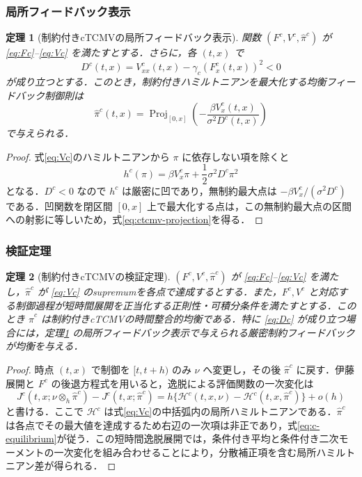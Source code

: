 \documentclass[10pt,a4paper]{article}
\theoremstyle{plain}
\newtheorem{theorem}{定理}
\theoremstyle{definition}
\DeclareMathOperator{\Proj}{Proj}
\newcommand{\Hamil}{\mathcal{H}}
\begin{document}
\subsubsection{局所フィードバック表示}

\begin{theorem}[制約付きcTCMVの局所フィードバック表示]
\label{thm:ctcmv-projection}
関数 $(F^c,V^c,\hat\pi^c)$ が \eqref{eq:Fc}--\eqref{eq:Vc} を満たすとする．さらに，各 $(t,x)$ で
\begin{equation}
  D^c(t,x)=V_{xx}^c(t,x)-\gamma_c(F_x^c(t,x))^2<0
  \label{eq:Dc}
\end{equation}
が成り立つとする．このとき，制約付きハミルトニアンを最大化する均衡フィードバック制御則は
\begin{equation}
  \boxed{
  \hat\pi^c(t,x)=
  \Proj_{[0,x]}
  \left(
  -\frac{\beta V_x^c(t,x)}{\sigma^2D^c(t,x)}
  \right)
  }
  \label{eq:ctcmv-projection}
\end{equation}
で与えられる．
\end{theorem}

\begin{proof}
式\eqref{eq:Vc}のハミルトニアンから $\pi$ に依存しない項を除くと
\[
 h^c(\pi)=\beta V_x^c\pi+\frac12\sigma^2D^c\pi^2
\]
となる．$D^c<0$ なので $h^c$ は厳密に凹であり，無制約最大点は $-\beta V_x^c/(\sigma^2D^c)$ である．凹関数を閉区間 $[0,x]$ 上で最大化する点は，この無制約最大点の区間への射影に等しいため，式\eqref{eq:ctcmv-projection}を得る．
\end{proof}

\subsubsection{検証定理}

\begin{theorem}[制約付きcTCMVの検証定理]
\label{thm:ctcmv-verification}
$(F^c,V^c,\hat\pi^c)$ が \eqref{eq:Fc}--\eqref{eq:Vc} を満たし，$\hat\pi^c$ が \eqref{eq:Vc} のsupremumを各点で達成するとする．また，$F^c,V^c$ と対応する制御過程が短時間展開を正当化する正則性・可積分条件を満たすとする．このとき $\hat\pi^c$ は制約付きcTCMVの時間整合的均衡である．特に \eqref{eq:Dc} が成り立つ場合には，定理\ref{thm:ctcmv-projection} の局所フィードバック表示で与えられる厳密制約フィードバックが均衡を与える．
\end{theorem}

\begin{proof}
時点 $(t,x)$ で制御を $[t,t+h)$ のみ $\nu$ へ変更し，その後 $\hat\pi^c$ に戻す．伊藤展開と $F^c$ の後退方程式を用いると，逸脱による評価関数の一次変化は
\[
 J^c(t,x;\nu\otimes_h\hat\pi^c)-J^c(t,x;\hat\pi^c)
 =h\{\Hamil^c(t,x,\nu)-\Hamil^c(t,x,\hat\pi^c)\}+o(h)
\]
と書ける．ここで $\Hamil^c$ は式\eqref{eq:Vc}の中括弧内の局所ハミルトニアンである．$\hat\pi^c$ は各点でその最大値を達成するため右辺の一次項は非正であり，式\eqref{eq:c-equilibrium}が従う．この短時間逸脱展開では，条件付き平均と条件付き二次モーメントの一次変化を組み合わせることにより，分散補正項を含む局所ハミルトニアン差が得られる．
\end{proof}
\end{document}
